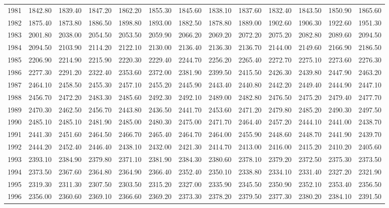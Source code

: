 \begin{longtable}{rrrrrrrrrrrrr}
  1981 & 1842.80 & 1839.40 & 1847.20 & 1862.20 & 1855.30 & 1845.60 & 1838.10 & 1837.60 & 1832.40 & 1843.50 & 1850.90 & 1865.60 \\ 
  1982 & 1875.40 & 1873.80 & 1886.50 & 1898.80 & 1893.00 & 1882.50 & 1878.80 & 1889.00 & 1902.60 & 1906.30 & 1922.60 & 1951.30 \\ 
  1983 & 2001.80 & 2038.00 & 2054.50 & 2053.50 & 2059.90 & 2066.20 & 2069.20 & 2072.20 & 2075.20 & 2082.80 & 2089.60 & 2094.50 \\ 
  1984 & 2094.50 & 2103.90 & 2114.20 & 2122.10 & 2130.00 & 2136.40 & 2136.30 & 2136.70 & 2144.00 & 2149.60 & 2166.90 & 2186.50 \\ 
  1985 & 2206.90 & 2214.90 & 2215.90 & 2220.30 & 2229.40 & 2244.70 & 2256.20 & 2265.40 & 2272.70 & 2275.10 & 2273.60 & 2276.30 \\ 
  1986 & 2277.30 & 2291.20 & 2322.40 & 2353.60 & 2372.00 & 2381.90 & 2399.50 & 2415.50 & 2426.30 & 2439.80 & 2447.90 & 2463.20 \\ 
  1987 & 2464.10 & 2458.50 & 2455.30 & 2457.10 & 2455.20 & 2445.90 & 2443.40 & 2440.80 & 2442.20 & 2449.40 & 2444.90 & 2447.10 \\ 
  1988 & 2456.70 & 2472.20 & 2483.30 & 2485.60 & 2492.30 & 2492.10 & 2489.00 & 2482.80 & 2476.50 & 2475.20 & 2479.40 & 2477.70 \\ 
  1989 & 2470.30 & 2462.50 & 2456.70 & 2443.80 & 2436.50 & 2441.70 & 2453.60 & 2471.20 & 2479.80 & 2485.20 & 2490.30 & 2497.50 \\ 
  1990 & 2485.10 & 2485.10 & 2481.90 & 2485.00 & 2480.30 & 2475.00 & 2471.70 & 2464.40 & 2457.20 & 2444.10 & 2441.00 & 2438.70 \\ 
  1991 & 2441.30 & 2451.60 & 2464.50 & 2466.70 & 2465.40 & 2464.70 & 2464.00 & 2455.90 & 2448.60 & 2448.70 & 2441.90 & 2439.70 \\ 
  1992 & 2444.20 & 2452.40 & 2446.40 & 2438.10 & 2432.00 & 2421.30 & 2414.70 & 2413.00 & 2416.00 & 2415.20 & 2410.20 & 2405.60 \\ 
  1993 & 2393.10 & 2384.90 & 2379.80 & 2371.10 & 2381.90 & 2384.30 & 2380.60 & 2378.10 & 2379.20 & 2372.50 & 2375.30 & 2373.50 \\ 
  1994 & 2373.50 & 2367.60 & 2364.80 & 2364.90 & 2366.40 & 2352.40 & 2350.10 & 2338.80 & 2334.10 & 2331.40 & 2327.20 & 2321.90 \\ 
  1995 & 2319.30 & 2311.30 & 2307.50 & 2303.50 & 2315.20 & 2327.00 & 2335.90 & 2345.50 & 2350.90 & 2352.10 & 2353.40 & 2356.50 \\ 
  1996 & 2356.00 & 2360.60 & 2369.10 & 2366.60 & 2369.20 & 2373.30 & 2378.20 & 2379.50 & 2377.30 & 2380.20 & 2384.10 & 2391.50 \\ 

\end{longtable}
